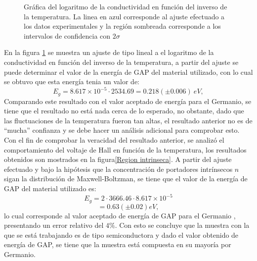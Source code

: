 \documentclass[%
 reprint,
 amsmath,amssymb,
 aps,
]{revtex4-1}
\begin{document}
\begin{figure}[h!]
\caption{\label{Conductividad en funcion de la temperatura}Gráfica del logaritmo de la conductividad en función del inverso de la temperatura.  La linea en azul corresponde al ajuste efectuado a los datos experimentales y la región sombreada corresponde a los intervalos de confidencia con $2\sigma$}
\end{figure}
En la figura \ref{Conductividad en funcion de la temperatura} se muestra un ajuste de tipo lineal a el logaritmo de la conductividad en función del inverso de la temperatura, a partir del ajuste se puede determinar el valor de la energía de GAP del material utilizado, con lo cual se obtuvo que esta energía tenia un valor de:
\[E_g=8.617\times 10^{-5}\cdot2534.69=0.218 (\pm 0.006) \ eV,\]
Comparando este resultado con el valor aceptado de energía para el Germanio\cite{Energia de gap}, se tiene que el resultado no está nada cerca de lo esperado, no obstante, dado que las fluctuaciones de la temperatura fueron tan altas, el resultado anterior no es de ``mucha'' confianza y se debe hacer un análisis adicional para comprobar esto. Con el fin de comprobar la veracidad del resultado anterior, se analizó el comportamiento del voltaje de Hall en función de la temperatura, los resultados obtenidos son mostrados en la figura\ref{Region intrinseca}. A partir del ajuste efectuado y bajo la hipótesis que la concentración de portadores intrínsecos $n$  sigan la distribución de Maxwell-Boltzman, se tiene que el valor de la energía de GAP del material utilizado es:
\[E_g=2\cdot 3666.46 \cdot8.617\times 10^{-5}\]
\[=0.63 (\pm 0.02) eV,\]
lo cual corresponde al valor aceptado de energía de GAP para el Germanio \cite{Energia de gap}, presentando un error relativo del $4\%$. Con esto se concluye que la muestra con la que se está trabajando es de tipo semiconductora y dado el valor obtenido de energía de GAP, se tiene que la muestra está compuesta en su mayoría por Germanio.
\end{document}
